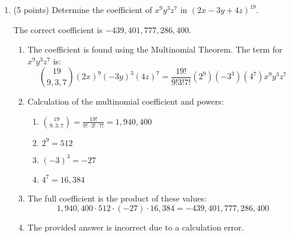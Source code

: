 \documentclass{article}
\begin{document}
\begin{enumerate}
  \newpage

  \item (5 points) Determine the coefficient of $x^9 y^3 z^7$ in $(2 x-3 y+4 z)^{19}$.
  \begin{answer}
    The correct coefficient is $-439,401,777,286,400$.
    \begin{enumerate}
      \item The coefficient is found using the Multinomial Theorem. 
      The term for $x^9 y^3 z^7$ is:
      $$
      \binom{19}{9, 3, 7} (2x)^9 (-3y)^3 (4z)^7 = \frac{19!}{9!3!7!} (2^9) (-3^3) (4^7) x^9 y^3 z^7
      $$
      \item Calculation of the multinomial coefficient and powers:
      \begin{enumerate}
        \item $\binom{19}{9, 3, 7} = \frac{19!}{9! \cdot 3! \cdot 7!} = 1,940,400$
        \item $2^9 = 512$
        \item $(-3)^3 = -27$
        \item $4^7 = 16,384$
      \end{enumerate}
      \item The full coefficient is the product of these values:
      $$
      1,940,400 \cdot 512 \cdot (-27) \cdot 16,384 = -439,401,777,286,400
      $$
      \item The provided answer is incorrect due to a calculation error.
    \end{enumerate}
  \end{answer}

  

  \newpage


\end{enumerate}
\end{document}
